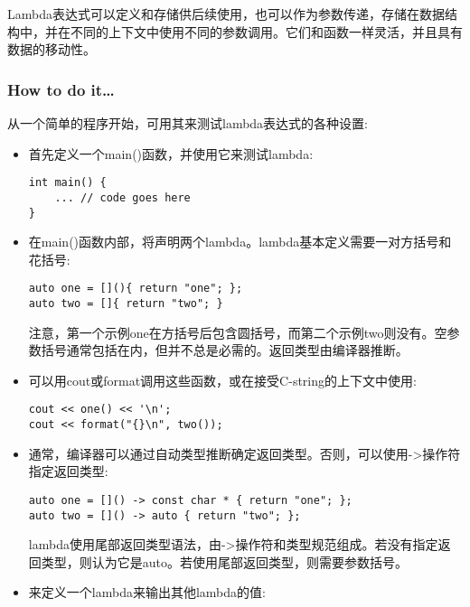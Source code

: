 
Lambda表达式可以定义和存储供后续使用，也可以作为参数传递，存储在数据结构中，并在不同的上下文中使用不同的参数调用。它们和函数一样灵活，并且具有数据的移动性。

\subsubsection{How to do it…}

从一个简单的程序开始，可用其来测试lambda表达式的各种设置:

\begin{itemize}
\item 
首先定义一个main()函数，并使用它来测试lambda:

\begin{lstlisting}[style=styleCXX]
int main() {
	... // code goes here
}
\end{lstlisting}

\item 
在main()函数内部，将声明两个lambda。lambda基本定义需要一对方括号和花括号:

\begin{lstlisting}[style=styleCXX]
auto one = [](){ return "one"; };
auto two = []{ return "two"; }
\end{lstlisting}

注意，第一个示例one在方括号后包含圆括号，而第二个示例two则没有。空参数括号通常包括在内，但并不总是必需的。返回类型由编译器推断。

\item 
可以用cout或format调用这些函数，或在接受C-string的上下文中使用:

\begin{lstlisting}[style=styleCXX]
cout << one() << '\n';
cout << format("{}\n", two());
\end{lstlisting}

\item 
通常，编译器可以通过自动类型推断确定返回类型。否则，可以使用->操作符指定返回类型:

\begin{lstlisting}[style=styleCXX]
auto one = []() -> const char * { return "one"; };
auto two = []() -> auto { return "two"; };
\end{lstlisting}

lambda使用尾部返回类型语法，由->操作符和类型规范组成。若没有指定返回类型，则认为它是auto。若使用尾部返回类型，则需要参数括号。

\item 
来定义一个lambda来输出其他lambda的值:


\end{itemize}
